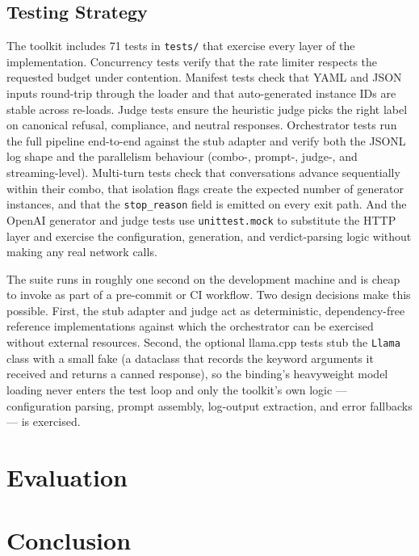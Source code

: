 \section{Testing Strategy}\label{sec:impl-testing}

The toolkit includes 71 tests in \texttt{tests/} that exercise every layer of the implementation.
Concurrency tests verify that the rate limiter respects the requested budget under contention.
Manifest tests check that YAML and JSON inputs round-trip through the loader and that auto-generated instance IDs are stable across re-loads.
Judge tests ensure the heuristic judge picks the right label on canonical refusal, compliance, and neutral responses.
Orchestrator tests run the full pipeline end-to-end against the stub adapter and verify both the JSONL log shape and the parallelism behaviour (combo-, prompt-, judge-, and streaming-level).
Multi-turn tests check that conversations advance sequentially within their combo, that isolation flags create the expected number of generator instances, and that the \texttt{stop\_reason} field is emitted on every exit path.
And the OpenAI generator and judge tests use \texttt{unittest.mock} to substitute the HTTP layer and exercise the configuration, generation, and verdict-parsing logic without making any real network calls.

The suite runs in roughly one second on the development machine and is cheap to invoke as part of a pre-commit or CI workflow.
Two design decisions make this possible.
First, the stub adapter and judge act as deterministic, dependency-free reference implementations against which the orchestrator can be exercised without external resources.
Second, the optional llama.cpp tests stub the \texttt{Llama} class with a small fake (a dataclass that records the keyword arguments it received and returns a canned response), so the binding's heavyweight model loading never enters the test loop and only the toolkit's own logic --- configuration parsing, prompt assembly, log-output extraction, and error fallbacks --- is exercised.

\chapter{Evaluation}\label{ch:evaluation}

\chapter{Conclusion}\label{ch:conclusion}

